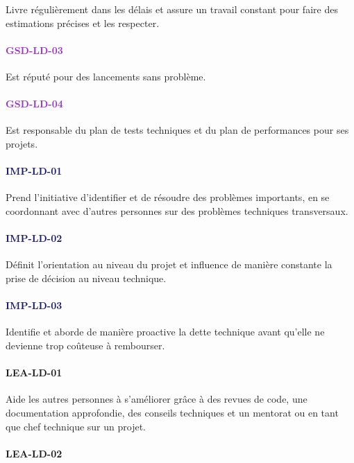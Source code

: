 \documentclass[a4paper, french, openany, 12pt]{book}
\newcommand\str[1]{\textcolor{DarkOrchid}{\textbf{\uppercase{gsd-{#1}}}}}
\newcommand\wis[1]{\textcolor{MidnightBlue}{\textbf{\uppercase{imp-{#1}}}}}
\newcommand\cha[1]{\textcolor{OliveGreen}{\textbf{\uppercase{lea-{#1}}}}}
\begin{document}
\begin{multicols}{2}
  Livre régulièrement dans les délais et assure un travail constant pour faire des estimations précises et les 
  respecter.

  \paragraph*{\str{ld-03}}

  Est réputé pour des lancements sans problème.

  \paragraph*{\str{ld-04}}

  Est responsable du plan de tests techniques et du plan de performances pour ses projets.

  \paragraph*{\wis{ld-01}}

  Prend l'initiative d'identifier et de résoudre des problèmes importants, en se coordonnant avec d'autres personnes sur
  des problèmes techniques transversaux.

  \paragraph*{\wis{ld-02}}

  Définit l'orientation au niveau du projet et influence de manière constante la prise de décision au niveau
  technique.
  \paragraph*{\wis{ld-03}}

  Identifie et aborde de manière proactive la dette technique avant qu'elle ne devienne trop coûteuse à rembourser.

  \paragraph*{\cha{ld-01}}

  Aide les autres personnes à s'améliorer grâce à des revues de code, une documentation approfondie, des conseils 
  techniques et un mentorat ou en tant que chef technique sur un projet.

  \paragraph*{\cha{ld-02}}


\end{multicols}
\end{document}
